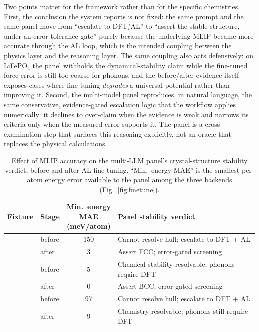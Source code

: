 \documentclass[conference]{IEEEtran}
\def\acs#1{#1}%
\begin{document}
Two points matter for the framework rather than for the specific chemistries.
First, the conclusion the system reports is not fixed: the same prompt and the
same panel move from ``escalate to \acs{DFT}/\acs{AL}'' to ``assert the
stable structure, under an error-tolerance gate'' purely because the underlying
\acs{MLIP} became more accurate through the \acs{AL} loop, which is the
intended coupling between the physics layer and the reasoning layer. The same
coupling also acts defensively: on LiFePO$_4$ the panel withholds the
dynamical-stability claim while the fine-tuned force error is still too coarse for
phonons, and the before/after evidence itself exposes cases where fine-tuning
\emph{degrades} a universal potential rather than improving it. Second, the
multi-model panel reproduces, in natural language, the same conservative,
evidence-gated escalation logic that the workflow applies numerically: it
declines to over-claim when the evidence is
weak and narrows its criteria only when the measured error supports it. The
panel is a cross-examination step that surfaces this reasoning explicitly, not
an oracle that replaces the physical calculations.

\begin{table}[t]
\centering
\footnotesize
\caption{Effect of \acs{MLIP} accuracy on the multi-\acs{LLM} panel's
crystal-structure stability verdict, before and after \acs{AL}
fine-tuning. ``Min.\ energy \acs{MAE}'' is the smallest per-atom energy error
available to the panel among the three backends (Fig.~\ref{fig:finetune}).}
\label{tab:hypothesis}
\setlength{\tabcolsep}{4pt}
\begin{tabular}{llcp{3.4cm}}
\toprule
Fixture & Stage & \shortstack{Min.\ energy\\\acs{MAE}\\(meV/atom)} & Panel stability verdict\\
\midrule
{}
 & before & 150 & Cannot resolve hull; escalate to \acs{DFT} + \acs{AL}\\
 & after  & 3   & Assert FCC; error-gated screening\\
\addlinespace
{}
 & before & 5   & Chemical stability resolvable; phonons require \acs{DFT}\\
 & after  & 0   & Assert BCC; error-gated screening\\
\addlinespace
{}
 & before & 97  & Cannot resolve hull; escalate to \acs{DFT} + \acs{AL}\\
 & after  & 9   & Chemistry resolvable; phonons still require \acs{DFT}\\
\bottomrule
\end{tabular}
\end{table}
\end{document}
